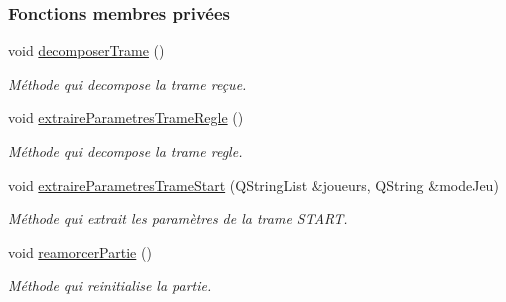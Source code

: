 \subsubsection*{Fonctions membres privées}
\begin{DoxyCompactItemize}
\item 
void \hyperlink{class_communication_aaf5333662717e69837d2d39164e5a303}{decomposer\+Trame} ()
\begin{DoxyCompactList}\small\item\em Méthode qui decompose la trame reçue. \end{DoxyCompactList}\item 
void \hyperlink{class_communication_aa7fd74ea88ca7b28cb00e6b74b902394}{extraire\+Parametres\+Trame\+Regle} ()
\begin{DoxyCompactList}\small\item\em Méthode qui decompose la trame regle. \end{DoxyCompactList}\item 
void \hyperlink{class_communication_a31f998e3410e7a1d9e65a05a5d51a9b9}{extraire\+Parametres\+Trame\+Start} (Q\+String\+List \&joueurs, Q\+String \&mode\+Jeu)
\begin{DoxyCompactList}\small\item\em Méthode qui extrait les paramètres de la trame S\+T\+A\+RT. \end{DoxyCompactList}\item 
void \hyperlink{class_communication_a56ed5d11756b1f9efcca609b9f8a59c9}{reamorcer\+Partie} ()
\begin{DoxyCompactList}\small\item\em Méthode qui reinitialise la partie. \end{DoxyCompactList}\end{DoxyCompactItemize}
